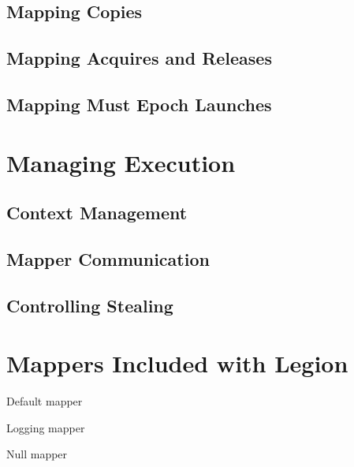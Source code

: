 \subsection{Mapping Copies}
\label{subsec:mapping:copies}

\subsection{Mapping Acquires and Releases}
\label{subsec:mapping:acquires}

\subsection{Mapping Must Epoch Launches}
\label{subsec:mapping:mustepoch}



\section{Managing Execution}
\label{sec:mapping:execution}

\subsection{Context Management}
\label{subsec:mapping:context}

\subsection{Mapper Communication}
\label{subsec:mapping:communication}

\subsection{Controlling Stealing}
\label{subsec:mapping:stealing}

\section{Mappers Included with Legion}

Default mapper

Logging mapper

Null mapper


